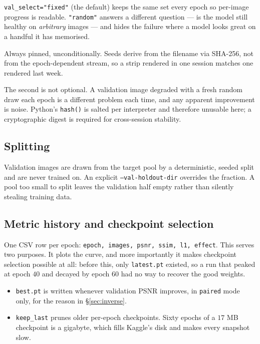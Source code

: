 \documentclass[11pt,a4paper]{article}
\newcommand{\code}[1]{\texttt{#1}}
\newcommand{\flag}[1]{\texttt{--#1}}
\begin{document}
\begin{description}[leftmargin=1.4em,style=nextline]
  \item[\emph{Which} images appear.] \code{val\_select="fixed"} (the default)
        keeps the same set every epoch so per-image progress is readable.
        \code{"random"} answers a different question --- is the model still healthy
        on \emph{arbitrary} images --- and hides the failure where a model looks
        great on a handful it has memorised.
  \item[\emph{How} each is degraded and seeded.] Always pinned, unconditionally.
        Seeds derive from the filename via SHA-256, not from the
        epoch-dependent stream, so a strip rendered in one session matches one
        rendered last week.
\end{description}

The second is not optional. A validation image degraded with a fresh random draw
each epoch is a different problem each time, and any apparent improvement is
noise. Python's \code{hash()} is salted per interpreter and therefore unusable
here; a cryptographic digest is required for cross-session stability.

\subsection{Splitting}

Validation images are drawn from the target pool by a deterministic, seeded
split and are never trained on. An explicit \flag{val-holdout-dir} overrides the
fraction. A pool too small to split leaves the validation half empty rather than
silently stealing training data.

\subsection{Metric history and checkpoint selection}

One CSV row per epoch:
\code{epoch, images, psnr, ssim, l1, effect}. This serves two purposes. It plots
the curve, and more importantly it makes checkpoint selection possible at all:
before this, only \code{latest.pt} existed, so a run that peaked at epoch $40$ and
decayed by epoch $60$ had no way to recover the good weights.

\begin{itemize}[leftmargin=1.4em]
  \item \code{best.pt} is written whenever validation PSNR improves, in
        \code{paired} mode only, for the reason in \S\ref{sec:inverse}.
  \item \code{keep\_last} prunes older per-epoch checkpoints. Sixty epochs of a
        $17$ MB checkpoint is a gigabyte, which fills Kaggle's disk and makes
        every snapshot slow.
\end{itemize}
\end{document}
